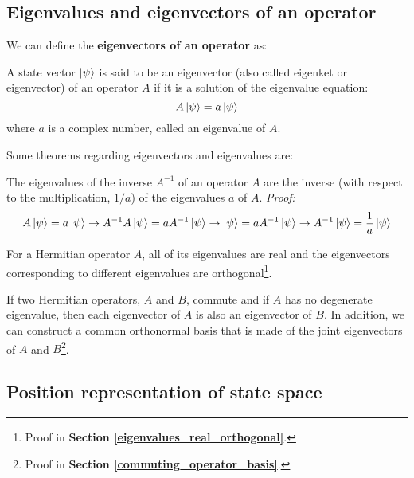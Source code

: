 \subsection{Eigenvalues and eigenvectors of an operator}

We can define the \textbf{eigenvectors of an operator} as:

\begin{definition}
    A state vector $\ket{\psi}$ is said to be an eigenvector (also called eigenket or eigenvector) of an operator $A$ if it is a solution of the eigenvalue equation:
    \begin{equation}
        A\ket{\psi} = a\ket{\psi}
    \end{equation}
    where $a$ is a complex number, called an eigenvalue of $A$.
\end{definition}

Some theorems regarding eigenvectors and eigenvalues are:
\begin{theorem}
    The eigenvalues of the inverse $A^{-1}$ of an operator $A$ are the inverse (with respect to the multiplication, $1/a$) of the eigenvalues $a$ of $A$. \textit{Proof:}
    \begin{equation}
        A\ket{\psi} = a\ket{\psi}\to A^{-1}A\ket{\psi} = aA^{-1}\ket{\psi} \to \ket{\psi} = a A^{-1}\ket{\psi}\to A^{-1}\ket{\psi} = \frac1a \ket{\psi}
    \end{equation}
\end{theorem}
\begin{theorem}
    For a Hermitian operator $A$, all of its eigenvalues are real and the eigenvectors corresponding to different eigenvalues are orthogonal\footnote{Proof in \textbf{Section \ref{eigenvalues_real_orthogonal}}.}.
\end{theorem}
\begin{theorem} \label{commuting_operator_base_thm}
    If two Hermitian operators, $A$ and $B$, commute and if $A$ has no degenerate eigenvalue, then each eigenvector of $A$ is also an eigenvector of $B$. In addition, we can construct a common orthonormal basis that is made of the joint eigenvectors of $A$ and $B$\footnote{Proof in \textbf{Section \ref{commuting_operator_basis}}.}.
\end{theorem}


\subsection{Position representation of state space}

